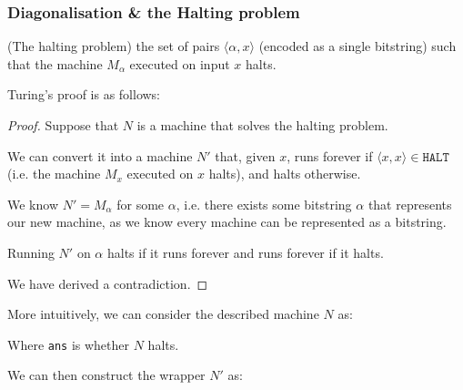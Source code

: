 \documentclass{beamer}
\begin{document}
\begin{frame}[allowframebreaks]
  \frametitle{Diagonalisation \& the Halting problem}

  \begin{problem}(The halting problem)
    the set of pairs $\langle \alpha,x \rangle $ (encoded as a single bitstring) such that the machine $M_{\alpha}$ executed on input $x$ halts.
  \end{problem}

  \framebreak
  Turing's proof is as follows:

    \begin{proof}
    Suppose that $N$ is a machine that solves the halting problem.

    We can convert it into a machine $N'$ that, given $x$, runs forever if $\langle x,x \rangle \in \texttt{HALT} $ (i.e. the machine $M_{x}$ executed on $x$ halts), and halts otherwise.

    We know $N' = M_{\alpha }$ for some $\alpha $, i.e. there exists some bitstring $\alpha $ that represents our new machine, as we know every machine can be represented as a bitstring.

    Running $N'$ on $\alpha$ halts if it runs forever and runs forever if it halts.

    We have derived a contradiction.


  \end{proof}

  \framebreak

  More intuitively, we can consider the described machine $N$ as:
    \begin{center}
  \end{center}

  Where  \texttt{ans} is whether $N$ halts.

  We can then construct the wrapper $N'$ as:



\end{frame}
\end{document}
